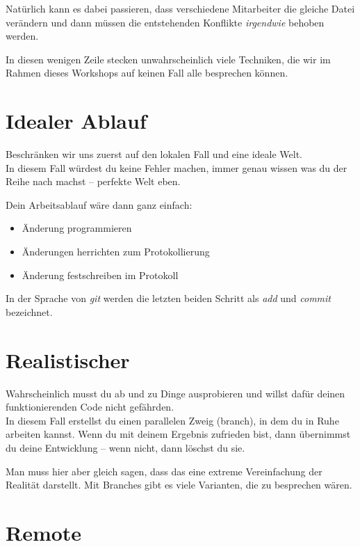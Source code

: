 \documentclass[
  letterpaper,
  DIV=11]{scrreprt}
\providecommand{\tightlist}{%
  \setlength{\itemsep}{0pt}\setlength{\parskip}{0pt}}\usepackage{longtable,booktabs,array}
\newcommand{\git}{\textit{git}\xspace}
\begin{document}
Natürlich kann es dabei passieren, dass verschiedene Mitarbeiter die
gleiche Datei verändern und dann müssen die entstehenden Konflikte
\emph{irgendwie} behoben werden.

In diesen wenigen Zeile stecken unwahrscheinlich viele Techniken, die
wir im Rahmen dieses Workshops auf keinen Fall alle besprechen können.

\section{Idealer Ablauf}\label{idealer-ablauf}

Beschränken wir uns zuerst auf den lokalen Fall und eine ideale Welt.\\
In diesem Fall würdest du keine Fehler machen, immer genau wissen was du
der Reihe nach machst -- perfekte Welt eben.

Dein Arbeitsablauf wäre dann ganz einfach:

\begin{itemize}
\tightlist
\item
  Änderung programmieren
\item
  Änderungen herrichten zum Protokollierung
\item
  Änderung festschreiben im Protokoll
\end{itemize}

In der Sprache von \git werden die letzten beiden Schritt als \emph{add}
und \emph{commit} bezeichnet.

\section{Realistischer}\label{realistischer}

Wahrscheinlich musst du ab und zu Dinge ausprobieren und willst dafür
deinen funktionierenden Code nicht gefährden.\\
In diesem Fall erstellst du einen parallelen Zweig (branch), in dem du
in Ruhe arbeiten kannst. Wenn du mit deinem Ergebnis zufrieden bist,
dann übernimmst du deine Entwicklung -- wenn nicht, dann löschst du sie.

Man muss hier aber gleich sagen, dass das eine extreme Vereinfachung der
Realität darstellt. Mit Branches gibt es viele Varianten, die zu
besprechen wären.

\section{Remote}\label{remote}
\end{document}
